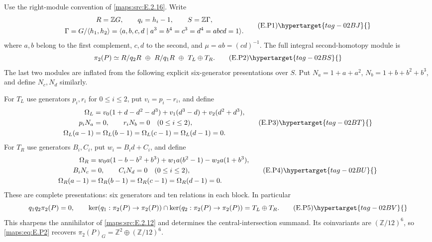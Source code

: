 \begin{theorem}\hypertarget{tag-02MH}{}\label{maps:src:E.2.17}


Use the right-module convention of \ref{maps:src:E.2.16}. Write
\[
 \begin{gathered}
 R=\mathbb ZG,\qquad q_i=h_i-1,\qquad S=\mathbb Z\Gamma,\\
 \Gamma=G/\langle h_1,h_2\rangle
  =\langle a,b,c,d\mid a^3=b^4=c^3=d^4=abcd=1\rangle.
 \end{gathered}
 \tag{E.P1}\hypertarget{tag-02BJ}{}\label{maps:eq:E.P1}
\]
where $a,b$ belong to the first complement, $c,d$ to
the second, and $\mu=ab=(cd)^{-1}$. The full integral
second-homotopy module is
\[
 \pi_2(P)\simeq R/q_2R\ \oplus\ R/q_1R
                    \ \oplus\ T_L\oplus T_R.
 \tag{E.P2}\hypertarget{tag-02BS}{}\label{maps:eq:E.P2}
\]
The last two modules are inflated from the following
explicit six-generator presentations over $S$.
Put $N_a=1+a+a^2$, $N_b=1+b+b^2+b^3$, and define
$N_c,N_d$ similarly.

For $T_L$ use generators $p_i,r_i$ for $0\leq i\leq2$,
put $v_i=p_i-r_i$, and define
\[
 \begin{split}
 \Omega_L={}&v_0(1+d-d^2-d^3)
       +v_1(d^3-d)+v_2(d^2+d^3),\\
 p_iN_a={}&0,\qquad r_iN_b=0\quad(0\leq i\leq2),\\
 \Omega_L(a-1)={}&\Omega_L(b-1)
       =\Omega_L(c-1)=\Omega_L(d-1)=0.
 \end{split}
 \tag{E.P3}\hypertarget{tag-02BT}{}\label{maps:eq:E.P3}
\]
For $T_R$ use generators $B_i,C_i$, put $w_i=B_id+C_i$,
and define
\[
 \begin{split}
 \Omega_R={}&w_0a(1-b-b^2+b^3)
              +w_1a(b^2-1)-w_2a(1+b^3),\\
 B_iN_c={}&0,\qquad C_iN_d=0\quad(0\leq i\leq2),\\
 \Omega_R(a-1)={}&\Omega_R(b-1)
       =\Omega_R(c-1)=\Omega_R(d-1)=0.
 \end{split}
 \tag{E.P4}\hypertarget{tag-02BU}{}\label{maps:eq:E.P4}
\]
These are complete presentations: six generators and
ten relations in each block. In particular
\[
 q_1q_2\pi_2(P)=0,\qquad
 \ker(q_1:\pi_2(P)\to\pi_2(P))
  \cap\ker(q_2:\pi_2(P)\to\pi_2(P))=T_L\oplus T_R.
 \tag{E.P5}\hypertarget{tag-02BV}{}\label{maps:eq:E.P5}
\]
This sharpens the annihilator of \cref{maps:src:E.2.12} and determines the central-intersection summand.
Its coinvariants are $(\mathbb Z/12)^6$, so \eqref{maps:eq:E.P2}
recovers $\pi_2(P)_G=\mathbb Z^2\oplus(\mathbb Z/12)^6$.


\end{theorem}
